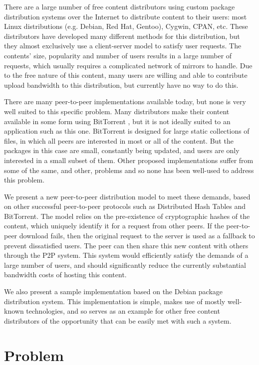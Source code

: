 \documentclass{sig-alt-release2}
\begin{document}
There are a large number of free content distributors using custom
package distribution systems over the Internet to distribute content
to their users: most Linux distributions (e.g. Debian, Red Hat,
Gentoo), Cygwin, CPAN, etc.
These distributors have developed many different
methods for this distribution, but they almost exclusively use a
client-server model to satisfy user requests. The contents' size,
popularity and number of users results in a large number of
requests, which usually requires a complicated network of mirrors to handle. Due
to the free nature of this content, many users are willing and able
to contribute upload bandwidth to this distribution, but currently
have no way to do this.

There are many peer-to-peer implementations available today, but
none is very well suited to this specific problem. Many distributors
make their content available in some form using BitTorrent \cite{COHEN03}, but it
is not ideally suited to an application such as this one. BitTorrent
is designed for large static collections of files, in which all
peers are interested in most or all of the content. But the packages
in this case are small, constantly being updated, and users are only
interested in a small subset of them. Other proposed implementations
suffer from some of the same, and other, problems and so none has
been well-used to address this problem.

We present a new peer-to-peer distribution model to meet these
demands, based on other successful peer-to-peer protocols such as
Distributed Hash Tables and BitTorrent.
The model relies on the pre-existence of cryptographic
hashes of the content, which uniquely identify it for a request from
other peers. If the peer-to-peer download fails, then the original
request to the server is used as a fallback to prevent dissatisfied
users. The peer can then share this new content with others through
the P2P system. This system would efficiently satisfy the demands of
a large number of users, and should significantly reduce the
currently substantial bandwidth costs of hosting this content.

We also present a sample implementation based on the Debian package
distribution system. This implementation is simple, makes use of
mostly well-known technologies, and so serves as an example for
other free content distributors of the opportunity that can be easily met
with such a system.

\section{Problem}
\end{document}
